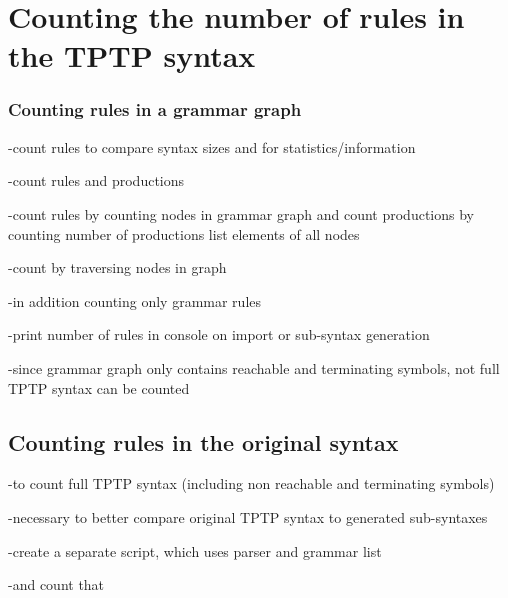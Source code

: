 \section{Counting the number of rules in the TPTP syntax}\label{sec:ConceptCountR}

\subsubsection{Counting rules in a grammar graph}\label{sec:ConceptCountR}

-count rules to compare syntax sizes and for statistics/information

-count rules and productions

-count rules by counting nodes in grammar graph and count productions by counting number of productions list elements of all nodes

-count by traversing nodes in graph

-in addition counting only grammar rules

-print number of rules in console on import or sub-syntax generation

-since grammar graph only contains reachable and terminating symbols, not full TPTP syntax can be counted

\subsection{Counting rules in the original syntax}\label{sec:ConceptCountR}

-to count full TPTP syntax (including non reachable and terminating symbols)

-necessary to better compare original TPTP syntax to generated sub-syntaxes

-create a separate script, which uses parser and grammar list

-and count that
